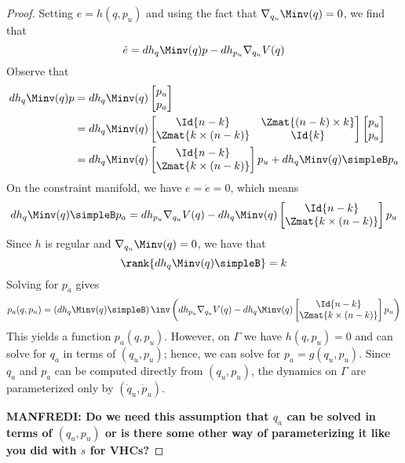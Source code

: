 \begin{proof}
    Setting \(e = h(q,p_u)\) and using the fact that 
    \(\nabla_{q_u}\Minv(q) = 0\), we find that
    \[
        \dot{e} = dh_q\Minv(q)p - dh_{p_u}\nabla_{q_u}V(q)
    \]
    Observe that
    \begin{align*}
        dh_q\Minv(q)p &= dh_q\Minv(q) \begin{bmatrix}p_u \\ p_a \end{bmatrix} \\
          &= dh_q\Minv(q) \begin{bmatrix}
              \Id{n-k} & \Zmat{(n-k)\times k} \\
              \Zmat{k \times(n-k)} & \Id{k} 
              \end{bmatrix} \begin{bmatrix} p_u \\ p_a \end{bmatrix} \\
        &= dh_q\Minv(q)\begin{bmatrix} \Id{n-k} \\ \Zmat{k \times
        (n-k)}\end{bmatrix} p_u + dh_q \Minv(q)\simpleB p_a
    \end{align*}
    On the constraint manifold, we have \(e = \dot{e} = 0\), which means
    \[
        dh_q\Minv(q)\simpleB p_a = dh_{p_u}\nabla_{q_u}V(q) -
            dh_q\Minv(q)\begin{bmatrix} 
            \Id{n-k} \\ \Zmat{k \times (n-k)}\end{bmatrix} p_u
    \]
    Since \(h\) is regular and \(\nabla_{q_u}\Minv(q) = 0\), we have that 
    \[
        \rank{dh_q\Minv(q)\simpleB} = k
    \]
    Solving for \(p_a\) gives
    \[
        p_a(q,p_u) = \left(dh_q\Minv(q)\simpleB\right)\inv
        \left(dh_{p_u}\nabla_{q_u}V(q) - 
            dh_q\Minv(q)\begin{bmatrix} 
        \Id{n-k} \\ \Zmat{k \times (n-k)}\end{bmatrix} p_u \right)
    \]
    This yields a function \(p_a(q,p_u)\). However, on \(\Gamma\) we have 
    \(h(q,p_u) = 0\) and can solve for \(q_a\) in terms of \((q_u,p_u)\);
    hence, we can solve for \(p_a = g(q_u,p_u)\). Since \(q_a\) and
    \(p_a\) can be computed directly from \((q_u,p_u)\), the dynamics on
    \(\Gamma\) are parameterized only by \((\dot{q}_u,\dot{p}_u)\).

    \textbf{MANFREDI: Do we need this assumption that \(q_a\) can be solved in
        terms of \((q_u,p_u)\) or is there some other way of parameterizing it
    like you did with \(s\) for VHCs?}
\end{proof}

